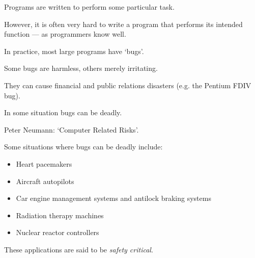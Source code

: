 \begin{slide*}


\vspace*{0.5cm}

Programs are written to perform some particular task.

However, it is often very hard to write a program that performs its intended
function --- as programmers know well.

In practice, most large programs have `bugs'.

Some bugs are harmless, others merely irritating.

They can cause financial and public relations disasters (e.g. the Pentium FDIV
bug).

In some situation bugs can be deadly.

{\green Peter Neumann: `Computer Related Risks'.}


\end{slide*}



\begin{slide*}


\vspace*{0.5cm}

Some situations where bugs can be deadly include:

\begin{itemize}

\item Heart pacemakers

\item Aircraft autopilots

\item Car engine management systems and antilock braking systems

\item Radiation therapy machines

\item Nuclear reactor controllers

\end{itemize}

These applications are said to be {\em safety critical}.

\end{slide*}



